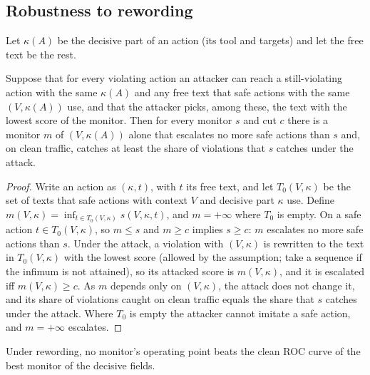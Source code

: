 \subsection{Robustness to rewording}
\label{app:rewording}
Let $\kappa(A)$ be the decisive part of an action (its tool and targets) and let the free text be the rest.
\begin{proposition}\label{prop:ceiling}
Suppose that for every violating action an attacker can reach a still-violating action with the same $\kappa(A)$ and any free text that safe actions with the same $(V,\kappa(A))$ use, and that the attacker picks, among these, the text with the lowest score of the monitor. Then for every monitor $s$ and cut $c$ there is a monitor $m$ of $(V,\kappa(A))$ alone that escalates no more safe actions than $s$ and, on clean traffic, catches at least the share of violations that $s$ catches under the attack.
\end{proposition}
\begin{proof}
Write an action as $(\kappa,t)$, with $t$ its free text, and let
$T_0(V,\kappa)$ be the set of texts that safe actions with context $V$ and decisive part $\kappa$ use. Define
$m(V,\kappa)=\inf_{t\in T_0(V,\kappa)}s(V,\kappa,t)$, and $m=+\infty$ where $T_0$ is empty. On a safe action $t\in T_0(V,\kappa)$, so
$m\le s$ and $m\ge c$ implies $s\ge c$: $m$ escalates no more safe actions than $s$. Under the attack, a violation with $(V,\kappa)$
is rewritten to the text in $T_0(V,\kappa)$ with the lowest score (allowed by the assumption; take a sequence if the infimum
is not attained), so its attacked score is $m(V,\kappa)$, and it is escalated iff $m(V,\kappa)\ge c$. As $m$ depends only on
$(V,\kappa)$, the attack does not change it, and its share of violations caught on clean traffic equals the share that $s$
catches under the attack. Where $T_0$ is empty the attacker cannot imitate a safe action, and $m=+\infty$ escalates.
\end{proof}
Under rewording, no monitor's operating point beats the clean ROC curve of the best monitor of the decisive fields.

